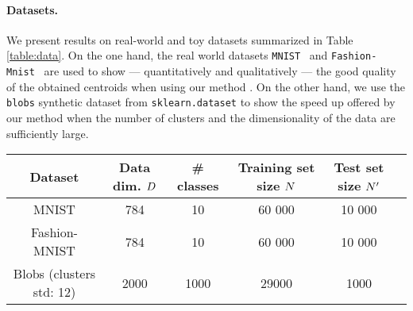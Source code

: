 \paragraph{Datasets.}
We present results on real-world and toy datasets summarized in Table \ref{table:data}. On the one hand, the real world datasets \texttt{MNIST}~\cite{lecun-mnisthandwrittendigit-2010} and \texttt{Fashion-Mnist}~\cite{Pedregosa2011Scikit} %
are used to show --- quantitatively and qualitatively --- the good quality of the obtained centroids when using our method \qkmeans. On the other hand, we use the \texttt{blobs} synthetic dataset from \texttt{sklearn.dataset} to show the speed up offered by our method \qkmeans when the number of clusters and the dimensionality of the data are sufficiently large.


\begin{table*}[!h]
\centering
\begin{tabular}{|c|c|c|c|c|c|}
\hline
\textbf{Dataset} & \textbf{Data dim.} $D$        & \textbf{\# classes} & \textbf{Training set size} $N$ & \textbf{Test set size} $N'$ \\ \hline
MNIST                   & 784   & 10        & 60 000    & 10 000               \\ \hline
Fashion-MNIST           & 784   & 10        & 60 000    & 10 000               \\ \hline
Blobs (clusters std: 12)   & 2000  & 1000      & 29000      & 1000               \\ \hline
\end{tabular}
\caption{Datasets statistics}
\label{table:data}
\end{table*}


